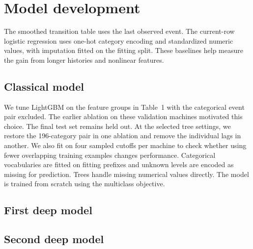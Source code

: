 \section{Model development}
The smoothed transition table uses the last observed event. The current-row logistic regression uses one-hot category encoding and standardized numeric values, with imputation fitted on the fitting split. These baselines help measure the gain from longer histories and nonlinear features.

\subsection{Classical model}
We tune LightGBM \cite{lightgbm} on the feature groups in Table~1 with the categorical event pair excluded. The earlier ablation on these validation machines motivated this choice. The final test set remains held out. At the selected tree settings, we restore the 196-category pair in one ablation and remove the individual lags in another. We also fit on four sampled cutoffs per machine to check whether using fewer overlapping training examples changes performance. Categorical vocabularies are fitted on fitting prefixes and unknown levels are encoded as missing for prediction. Trees handle missing numerical values directly. The model is trained from scratch using the multiclass objective.

\subsection{First deep model}

\subsection{Second deep model}
